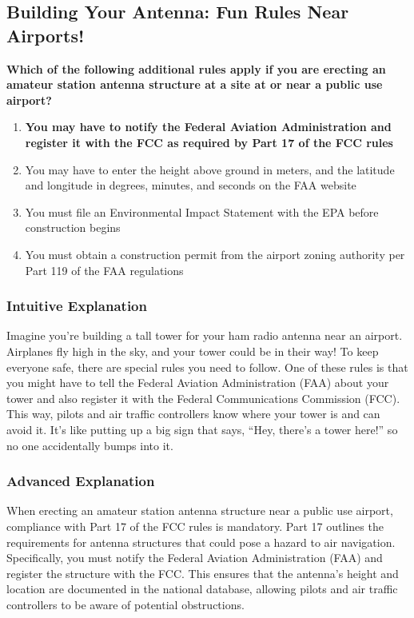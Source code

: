 \subsection{Building Your Antenna: Fun Rules Near Airports!}

\begin{tcolorbox}[colback=gray!10!white,colframe=black!75!black,title=\textbf{E1B06}]
\textbf{Which of the following additional rules apply if you are erecting an amateur station antenna structure at a site at or near a public use airport?}
\begin{enumerate}[label=\Alph*.]
    \item \textbf{You may have to notify the Federal Aviation Administration and register it with the FCC as required by Part 17 of the FCC rules}
    \item You may have to enter the height above ground in meters, and the latitude and longitude in degrees, minutes, and seconds on the FAA website
    \item You must file an Environmental Impact Statement with the EPA before construction begins
    \item You must obtain a construction permit from the airport zoning authority per Part 119 of the FAA regulations
\end{enumerate}
\end{tcolorbox}

\subsubsection{Intuitive Explanation}
Imagine you’re building a tall tower for your ham radio antenna near an airport. Airplanes fly high in the sky, and your tower could be in their way! To keep everyone safe, there are special rules you need to follow. One of these rules is that you might have to tell the Federal Aviation Administration (FAA) about your tower and also register it with the Federal Communications Commission (FCC). This way, pilots and air traffic controllers know where your tower is and can avoid it. It’s like putting up a big sign that says, “Hey, there’s a tower here!” so no one accidentally bumps into it.

\subsubsection{Advanced Explanation}
When erecting an amateur station antenna structure near a public use airport, compliance with Part 17 of the FCC rules is mandatory. Part 17 outlines the requirements for antenna structures that could pose a hazard to air navigation. Specifically, you must notify the Federal Aviation Administration (FAA) and register the structure with the FCC. This ensures that the antenna’s height and location are documented in the national database, allowing pilots and air traffic controllers to be aware of potential obstructions.

